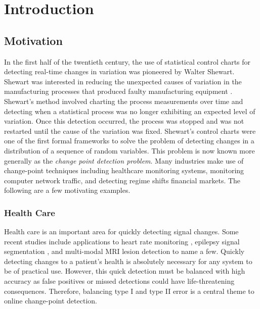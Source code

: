 \chapter{Introduction}
\section{Motivation}
In the first half of the twentieth century, the use of statistical control charts for detecting real-time changes in variation was pioneered by Walter Shewart.  Shewart was interested in reducing the unexpected causes of variation in the manufacturing processes that produced faulty manufacturing equipment \cite{shewhart1931economic}. Shewart's method involved charting the process measurements over time and detecting when a statistical process was no longer exhibiting an expected level of variation. Once this detection occurred, the process was stopped and was not restarted until the cause of the variation was fixed.
Shewart's control charts were one of the first formal frameworks to solve the problem of detecting changes in a distribution of a sequence of random variables. This problem is now known more generally as the \textit{change point detection problem}. Many industries make use of change-point techniques including healthcare monitoring systems, monitoring computer network traffic, and detecting regime shifts financial markets. The following are a few motivating examples.

\subsection{Health Care}
Health care is an important area for quickly detecting signal changes. Some recent studies include applications to heart rate monitoring \cite{yang2006adaptive} \cite{staudacher2005new}, epilepsy signal segmentation \cite{malladi2013online}, and multi-modal MRI lesion detection \cite{bosc2003automatic} to name a few. Quickly detecting changes to a patient's health is absolutely necessary for any system to be of practical use. However, this quick detection must be balanced with high accuracy as false positives or missed detections could have life-threatening consequences. Therefore, balancing type I and type II error is a central theme to online change-point detection.


